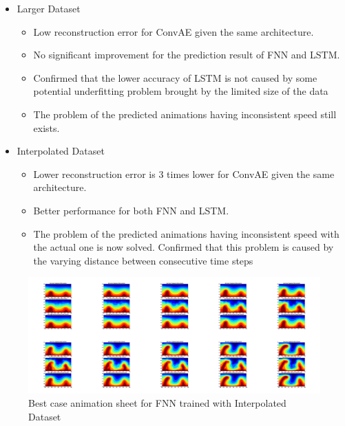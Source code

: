 {\begin{itemize}
\begin{itemize}
            \item predicted animations generated by FNN and LSTM are either moving faster or slower than the actual simulations
            
        \end{itemize}
        
    \item Larger Dataset
        \begin{itemize}
            \item Low reconstruction error for ConvAE given the same architecture.

            \item No significant improvement for the prediction result of FNN and LSTM.

            \item Confirmed that the lower accuracy of LSTM is not caused by some potential underfitting problem brought by the limited size of the data
            
            \item The problem of the predicted animations having inconsistent speed still exists.
            
        \end{itemize}

        
    \item Interpolated Dataset
    
    \begin{itemize}
            \item Lower reconstruction error is 3 times lower for ConvAE given the same architecture.

            \item Better performance for both FNN and LSTM.
            
            \item The problem of the predicted animations having inconsistent speed with the actual one is now solved. Confirmed that this problem is caused by the varying distance between consecutive time steps
            
    \end{itemize} 
 
        
\end{itemize}

\begin{figure}[H]
    \includegraphics[width=\linewidth]{figures/FNN_Best_GIF_sheet.png}
    \caption{Best case animation sheet for FNN trained with Interpolated Dataset}
\end{figure}

}
